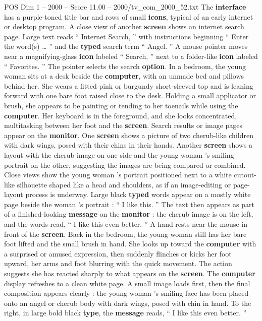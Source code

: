 \begin{textsample}{POS Dim 1 – 2000 – Score 11.00 – 2000/tv\_com\_2000\_52.txt}
The \textbf{interface} has a purple-toned title bar and rows of small \textbf{icons}, typical of an early internet or desktop program.
A close view of another \textbf{screen} shows an internet search page.
Large text reads “ Internet Search, ” with instructions beginning “ Enter the word(s) … ” and the \textbf{typed} search term “ Angel. ” A mouse pointer moves near a magnifying-glass \textbf{icon} labeled “ Search, ” next to a folder-like \textbf{icon} labeled “ Favorites. ” The pointer selects the search \textbf{option}.
In a bedroom, the young woman sits at a desk beside the \textbf{computer}, with an unmade bed and pillows behind her.
She wears a fitted pink or burgundy short-sleeved top and is leaning forward with one bare foot raised close to the desk.
Holding a small applicator or brush, she appears to be painting or tending to her toenails while using the \textbf{computer}.
Her keyboard is in the foreground, and she looks concentrated, multitasking between her foot and the \textbf{screen}.
Search results or image pages appear on the \textbf{monitor}.
One \textbf{screen} shows a picture of two cherub-like children with dark wings, posed with their chins in their hands.
Another \textbf{screen} shows a layout with the cherub image on one side and the young woman ’s smiling portrait on the other, suggesting the images are being compared or combined.
Close views show the young woman ’s portrait positioned next to a white cutout-like silhouette shaped like a head and shoulders, as if an image-editing or page-layout process is underway.
Large black \textbf{typed} words appear on a mostly white page beside the woman ’s portrait : “ I like this. ” The text then appears as part of a finished-looking \textbf{message} on the \textbf{monitor} : the cherub image is on the left, and the words read, “ I like this even better. ” A hand rests near the mouse in front of the \textbf{screen}.
Back in the bedroom, the young woman still has her bare foot lifted and the small brush in hand.
She looks up toward the \textbf{computer} with a surprised or amused expression, then suddenly flinches or kicks her foot upward, her arms and foot blurring with the quick movement.
The action suggests she has reacted sharply to what appears on the \textbf{screen}.
The \textbf{computer} display refreshes to a clean white page.
A small image loads first, then the final composition appears clearly : the young woman ’s smiling face has been placed onto an angel or cherub body with dark wings, posed with chin in hand.
To the right, in large bold black \textbf{type}, the \textbf{message} reads, “ I like this even better. ”

\end{textsample}
